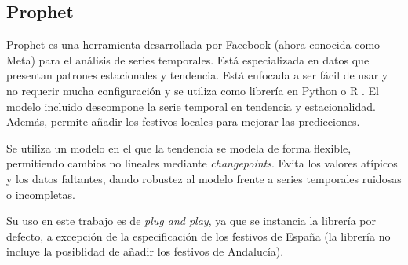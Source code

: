 \subsection{Prophet}

Prophet \cite{prophet} es una herramienta desarrollada por Facebook (ahora conocida como Meta) para el análisis de series temporales. Está especializada en datos que presentan patrones estacionales y tendencia. Está enfocada a ser fácil de usar y no requerir mucha configuración y se utiliza como librería en Python o R \cite{R}. El modelo incluido descompone la serie temporal en tendencia y estacionalidad. Además, permite añadir los festivos locales para mejorar las predicciones.

Se utiliza un modelo en el que la tendencia se modela de forma flexible, permitiendo cambios no lineales mediante \textit{changepoints}. Evita los valores atípicos y los datos faltantes, dando robustez al modelo frente a series temporales ruidosas o incompletas.

Su uso en este trabajo es de \textit{plug and play}, ya que se instancia la librería por defecto, a excepción de la especificación de los festivos de España (la librería no incluye la posiblidad de añadir los festivos de Andalucía).

\subsection{}